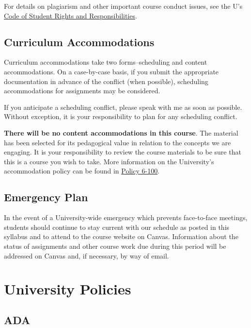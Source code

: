 \documentclass[
  letterpaper,
]{article}
\begin{document}
For details on plagiarism and other important course conduct issues, see
the U's \href{http://regulations.utah.edu/academics/6-400.php}{Code of
Student Rights and Responsibilities}.

\hypertarget{curriculum-accommodations}{%
\subsection{Curriculum Accommodations}\label{curriculum-accommodations}}

Curriculum accommodations take two forms--scheduling and content
accommodations. On a case-by-case basis, if you submit the appropriate
documentation in advance of the conflict (when possible), scheduling
accommodations for assignments may be considered.

If you anticipate a scheduling conflict, please speak with me as soon as
possible. Without exception, it is your responsibility to plan for any
scheduling conflict.

\textbf{There will be no content accommodations in this course}. The
material has been selected for its pedagogical value in relation to the
concepts we are engaging. It is your responsibility to review the course
materials to be sure that this is a course you wish to take. More
information on the University's accommodation policy can be found in
\href{https://regulations.utah.edu/academics/6-100.php}{Policy 6-100}.

\hypertarget{emergency-plan}{%
\subsection{Emergency Plan}\label{emergency-plan}}

In the event of a University-wide emergency which prevents face-to-face
meetings, students should continue to stay current with our schedule as
posted in this syllabus and to attend to the course website on Canvas.
Information about the status of assignments and other course work due
during this period will be addressed on Canvas and, if necessary, by way
of email.

\hypertarget{sec-Upolicies}{%
\section{University Policies}\label{sec-Upolicies}}

\hypertarget{ada}{%
\subsection{ADA}\label{ada}}
\end{document}

